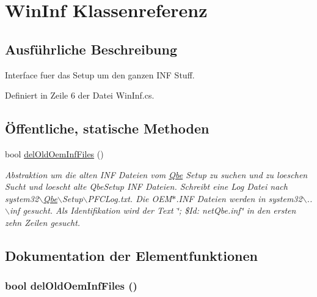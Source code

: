 \hypertarget{classQbeSAS_1_1WinInf}{
\section{Win\-Inf Klassenreferenz}
\label{classQbeSAS_1_1WinInf}
}


\subsection{Ausf\"{u}hrliche Beschreibung}
Interface fuer das Setup um den ganzen INF Stuff. 



Definiert in Zeile 6 der Datei Win\-Inf.cs.\subsection*{\"{O}ffentliche, statische Methoden}
\begin{CompactItemize}
\item 
bool \hyperlink{classQbeSAS_1_1WinInf_QbeSAS_1_1WinInfe0}{del\-Old\-Oem\-Inf\-Files} ()
\begin{CompactList}\small\item\em Abstraktion um die alten INF Dateien vom \hyperlink{namespaceQbe}{Qbe} Setup zu suchen und zu loeschen Sucht und loescht alte Qbe\-Setup INF Dateien. Schreibt eine Log Datei nach system32$\backslash$\hyperlink{namespaceQbe}{Qbe}$\backslash$Setup$\backslash$PFCLog.txt. Die OEM$\ast$.INF Dateien werden in system32$\backslash$..$\backslash$inf gesucht. Als Identifikation wird der Text \char`\"{}; \$Id: net\-Qbe.inf\char`\"{} in den ersten zehn Zeilen gesucht. \item\end{CompactList}\end{CompactItemize}


\subsection{Dokumentation der Elementfunktionen}
\hypertarget{classQbeSAS_1_1WinInf_QbeSAS_1_1WinInfe0}{
\subsubsection[delOldOemInfFiles]{\setlength{\rightskip}{0pt plus 5cm}bool del\-Old\-Oem\-Inf\-Files ()}}
\label{classQbeSAS_1_1WinInf_QbeSAS_1_1WinInfe0}


